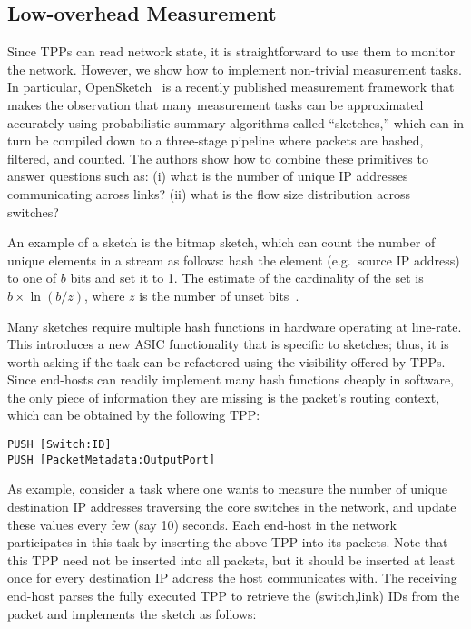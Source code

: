 \begin{eext}
\subsection{Low-overhead Measurement}\label{subsec:sketch}
Since TPPs can read network state, it is straightforward to use them
to monitor the network.  However, we show how to implement non-trivial
measurement tasks.  In particular, OpenSketch~\cite{yu2013software} is
a recently published measurement framework that makes the
observation that many measurement tasks can be approximated accurately
using probabilistic summary algorithms called ``sketches,'' which can in turn be compiled down to a three-stage
pipeline where packets are hashed, filtered, and counted.  The authors
show how to combine these primitives to answer questions such as: (i)
what is the number of unique IP addresses communicating across links?
(ii) what is the flow size distribution across switches?

An example of a sketch is the bitmap sketch, which can count the
number of unique elements in a stream as follows: hash the element
(e.g.\ source IP address) to one of $b$ bits and set it to 1.  The
estimate of the cardinality of the set is $b\times\ln(b/z)$, where $z$
is the number of unset bits~\cite{estan2003bitmap}.

Many sketches require multiple hash functions in hardware operating at
line-rate.  This introduces a new ASIC functionality that is specific
to sketches; thus, it is worth asking if the task can be refactored
using the visibility offered by TPPs.  Since end-hosts can readily
implement many hash functions cheaply in software, the only piece of
information they are missing is the packet's routing context, which
can be obtained by the following TPP:
\begin{verbatim}
PUSH [Switch:ID]
PUSH [PacketMetadata:OutputPort]
\end{verbatim}

As example, consider a task where one wants to measure the number of
unique destination IP addresses traversing the core switches in the
network, and update these values every few (say 10) seconds.  Each
end-host in the network participates in this task by inserting the
above TPP into its packets.  Note that this TPP need not be inserted
into all packets, but it should be inserted at least once for every
destination IP address the host communicates with.  The receiving
end-host parses the fully executed TPP to retrieve the (switch,link)
IDs from the packet and implements the sketch as follows:


\end{eext}
